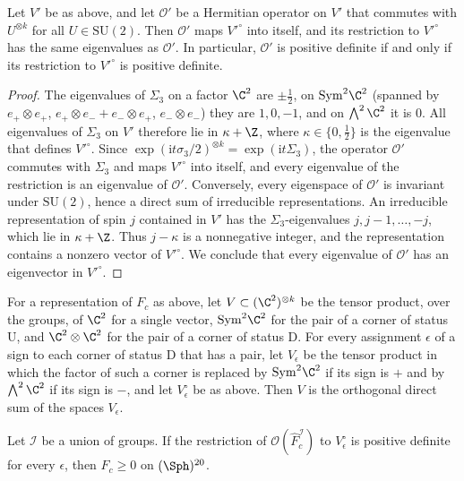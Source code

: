 \begin{lemma}\label{l:sector}
Let $V'$ be as above, and let $\mathcal O'$ be a Hermitian operator on $V'$ that commutes with $U^{\otimes k}$ for all $U \in \mathrm{SU}(2)$. Then $\mathcal O'$ maps $V'^{\circ}$ into itself, and its restriction to $V'^{\circ}$ has the same eigenvalues as $\mathcal O'$. In particular, $\mathcal O'$ is positive definite if and only if its restriction to $V'^{\circ}$ is positive definite.
\end{lemma}

\begin{proof}
The eigenvalues of $\Sigma_3$ on a factor $\C^2$ are $\pm \frac12$, on $\mathrm{Sym}^2 \C^2$ (spanned by $e_+ \otimes e_+$, $e_+ \otimes e_- + e_- \otimes e_+$, $e_- \otimes e_-$) they are $1, 0, -1$, and on $\bigwedge^2 \C^2$ it is $0$. All eigenvalues of $\Sigma_3$ on $V'$ therefore lie in $\kappa + \Z$, where $\kappa \in \{0, \frac12\}$ is the eigenvalue that defines $V'^{\circ}$. Since $\exp(\mathrm i t \sigma_3 / 2)^{\otimes k} = \exp(\mathrm i t \Sigma_3)$, the operator $\mathcal O'$ commutes with $\Sigma_3$ and maps $V'^{\circ}$ into itself, and every eigenvalue of the restriction is an eigenvalue of $\mathcal O'$. Conversely, every eigenspace of $\mathcal O'$ is invariant under $\mathrm{SU}(2)$, hence a direct sum of irreducible representations. An irreducible representation of spin $j$ contained in $V'$ has the $\Sigma_3$-eigenvalues $j, j - 1, \dots, -j$, which lie in $\kappa + \Z$. Thus $j - \kappa$ is a nonnegative integer, and the representation contains a nonzero vector of $V'^{\circ}$. We conclude that every eigenvalue of $\mathcal O'$ has an eigenvector in $V'^{\circ}$.
\end{proof}

For a representation of $F_c$ as above, let $V \subset (\C^2)^{\otimes k}$ be the tensor product, over the groups, of $\C^2$ for a single vector, $\mathrm{Sym}^2 \C^2$ for the pair of a corner of status $\mathrm U$, and $\C^2 \otimes \C^2$ for the pair of a corner of status $\mathrm D$. For every assignment $\epsilon$ of a sign to each corner of status $\mathrm D$ that has a pair, let $V_\epsilon$ be the tensor product in which the factor of such a corner is replaced by $\mathrm{Sym}^2 \C^2$ if its sign is $+$ and by $\bigwedge^2 \C^2$ if its sign is $-$, and let $V_\epsilon^{\circ}$ be as above. Then $V$ is the orthogonal direct sum of the spaces $V_\epsilon$.

\begin{proposition}\label{p:certificate}
Let $\mathcal I$ be a union of groups. If the restriction of $\mathcal O(\hat F_c^{\mathcal I})$ to $V_\epsilon^{\circ}$ is positive definite for every $\epsilon$, then $F_c \ge 0$ on $(\Sph)^{20}$.
\end{proposition}

